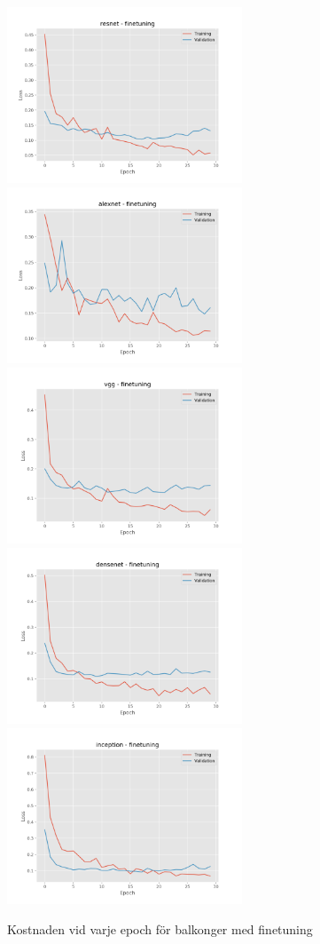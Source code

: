 \documentclass[]{kththesis}
\begin{document}
  \begin{figure}[h]
    \includegraphics[width=7cm]{b_l_resnet_fine}
    \includegraphics[width=7cm]{b_l_alexnet_fine}
    \includegraphics[width=7cm]{b_l_vgg_fine}
    \includegraphics[width=7cm]{b_l_densenet_fine}
    \includegraphics[width=7cm]{b_l_inception_fine}
    \caption{Kostnaden vid varje epoch för balkonger med finetuning}
    \label{fig:b_l_2}
  \end{figure}
  
\end{document}
